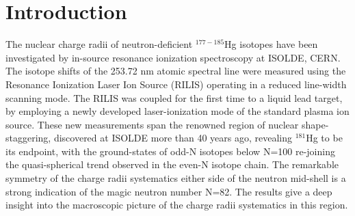 \section{Introduction}
The nuclear charge radii of neutron-deficient $^{177-185}$Hg isotopes have been investigated by in-source resonance ionization spectroscopy at ISOLDE, CERN.  The isotope shifts of the 253.72 nm atomic spectral line were measured using the Resonance Ionization Laser Ion Source (RILIS) operating in a reduced line-width scanning mode.  The RILIS was coupled for the first time to a liquid lead target, by employing a newly developed laser-ionization mode of the standard plasma ion source. These new measurements span the renowned region of nuclear shape-staggering, discovered at ISOLDE more than 40 years ago, revealing $^{181}$Hg to be its endpoint, with the ground-states of odd-N isotopes below N=100 re-joining the quasi-spherical trend observed in the even-N isotope chain.  The remarkable symmetry of the charge radii systematics either side of the neutron mid-shell is a strong indication of the magic neutron number N=82.
The results give a deep insight into the macroscopic picture of the charge radii systematics in this region.